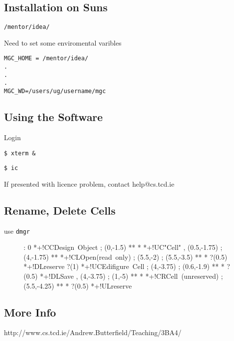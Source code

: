 \documentclass[a4paper,12pt]{article}
\begin{document}
\subsection*{Installation on Suns}

\verb!/mentor/idea/!

Need to set some enviromental varibles

\begin{verbatim}
MGC_HOME = /mentor/idea/
.
.
.
MGC_WD=/users/ug/username/mgc
\end{verbatim}

\subsection*{Using the Software}

Login

\verb!$ xterm &!

\verb!$ ic!

If presented with licence problem, contact help@cs.tcd.ie

\subsection*{Rename, Delete Cells}

use \verb!dmgr!

\begin{figure}[h]

\xy <1cm,0cm>:
0 *+!CC{\mbox{Design Object}} ; (0,-1.5) **\dir{-} *\dir{>} *+!UC{\mbox{"Cell"}} ,
(0.5,-1.75) ; (4,-1.75) **\dir{-} *+!CL{\mbox{Open \\ (read only)}} ;
(5.5,-2) ; (5.5,-3.5) **\dir{-} *\dir{>} ?(0.5) *+!DL{\mbox{reserve}} ?(1) *+!UC{\mbox{Edifigure Cell}} ;
(4,-3.75) ; (0.6,-1.9) **\dir{-} *\dir{>} ?(0.5) *+!DL{\mbox{Save}} ,
(4,-3.75) ; (1,-5) **\dir{-} *\dir{>} *+!CR{\mbox{Cell (unreserved)}} ;
(5.5,-4.25) ** *\dir{>} ?(0.5) *+!UL{\mbox{reserve}}
\endxy

\end{figure}

\subsection*{More Info}

http://www.cs.tcd.ie/Andrew.Butterfield/Teaching/3BA4/
\end{document}
